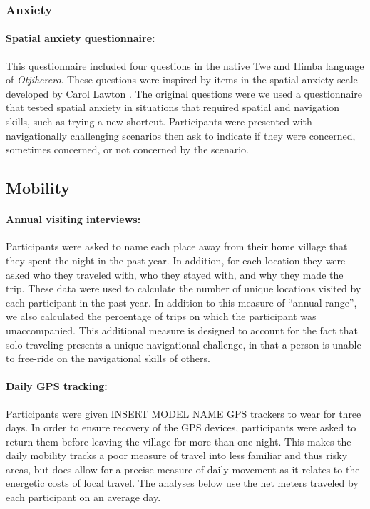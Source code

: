 		\subsubsection{Anxiety}
		\label{sec:2.2.3}
		
\paragraph{Spatial anxiety questionnaire:}  This questionnaire included four questions in the native Twe and Himba language of \emph{Otjiherero}.  These questions were inspired by items in the spatial anxiety scale developed by Carol Lawton \citep{lawton1994gender}.  The original questions were    we used a questionnaire that tested spatial anxiety in situations that required spatial and navigation skills, such as trying a new shortcut. Participants were presented with navigationally challenging scenarios then ask to indicate if they were concerned, sometimes concerned, or not concerned by the scenario.

	\subsection{Mobility}
	\label{sec:2.2.4}
	
\paragraph{Annual visiting interviews:}  Participants were asked to name each place away from their home village that they spent the night in the past year.  In addition, for each location they were asked who they traveled with, who they stayed with, and why they made the trip.  These data were used to calculate the number of unique locations visited by each participant in the past year.  In addition to this measure of ``annual range'', we also calculated the percentage of trips on which the participant was unaccompanied.  This additional measure is designed to account for the fact that solo traveling presents a unique navigational challenge, in that a person is unable to free-ride on the navigational skills of others.

\paragraph{Daily GPS tracking:}  Participants were given INSERT MODEL NAME GPS trackers to wear for three days.  In order to ensure recovery of the GPS devices, participants were asked to return them before leaving the village for more than one night.  This makes the daily mobility tracks a poor measure of travel into less familiar and thus risky areas, but does allow for a precise measure of daily movement as it relates to the energetic costs of local travel.  The analyses below use the net meters traveled by each participant on an average day. 

